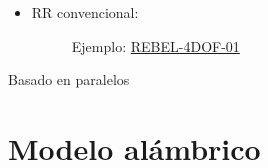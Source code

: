\begin{itemize}
\item \ac{RR convencional}:
\begin{figure} [h!]
  \centering    
  \hspace{3cm}
  \caption[Rebel]{Ejemplo: \href{https://www.igus.es/product/20962?artNr=REBEL-4DOF-01}{REBEL-4DOF-01}}
\end{figure}

\end{itemize}


Basado en paralelos

\section{Modelo alámbrico}
